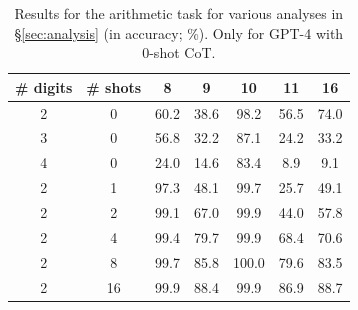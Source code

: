 


\begin{table}[t!]
    \centering
    \caption{\label{tab:numbers-math}
    Results for the arithmetic task (in accuracy; \%).
    }
\end{table}

\begin{table}[t!]
    \centering
    \begin{tabular}{cc|ccccc}
        \toprule
        \# digits & \# shots & 8 & 9 & 10 & 11 & 16 \\
        \midrule
        2 & 0 & 60.2 & 38.6 & 98.2 & 56.5 & 74.0 \\
        3 & 0 & 56.8 & 32.2 & 87.1 & 24.2 & 33.2 \\
        4 & 0 & 24.0 & 14.6 & 83.4 & \phantom{0}8.9 & \phantom{0}9.1 \\
        2 & 1 & 97.3 & 48.1 & 99.7 & 25.7 & 49.1 \\
        2 & 2 & 99.1 & 67.0 & 99.9 & 44.0 & 57.8 \\
        2 & 4 & 99.4 & 79.7 & 99.9 & 68.4 & 70.6 \\
        2 & 8 & 99.7 & 85.8 & 100.0 & 79.6 & 83.5 \\
        2 & 16 & 99.9 & 88.4 & 99.9 & 86.9 & 88.7 \\
        \bottomrule        
    \end{tabular}
    \caption{\label{tab:numbers-math-analysis}
    Results for the arithmetic task for various analyses in \S\ref{sec:analysis} (in accuracy; \%). Only for GPT-4 with 0-shot CoT.
    }
\end{table}
